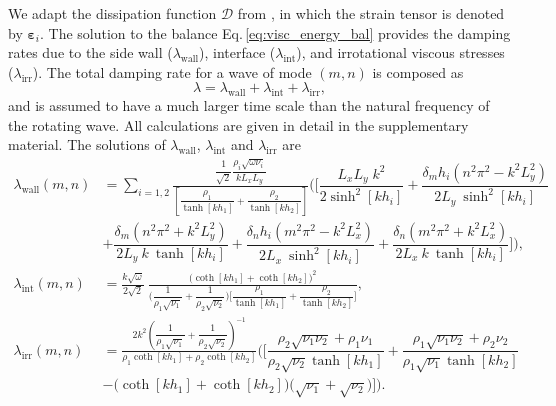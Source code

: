 \documentclass[aps,prfluids,reprint,superscriptaddress]{revtex4-2}
\newcommand{\ii}[1]{\text{#1}}
\newcommand{\nn}{\nonumber}
\begin{document}
We adapt the dissipation function $\mathcal{D}$ from \citet{Lamb1945}, in which the strain tensor is denoted by $\bm{\varepsilon}_i$. The solution to the balance Eq.\,\eqref{eq:visc_energy_bal} provides the damping rates due to the side wall ($\lambda_{\ii{wall}}$), interface ($\lambda_{\ii{int}}$), and irrotational viscous stresses ($\lambda_{\ii{irr}}$). The total damping rate for a wave of mode $(m,n)$ is composed as
\begin{equation}
	\lambda = \lambda_{\ii{wall}}+\lambda_{\ii{int}}+\lambda_{\ii{irr}},
	\label{eq:visc_damp_sum}
\end{equation}
and is assumed to have a much larger time scale than the natural frequency of the rotating wave. All calculations are given in detail in the supplementary material. The solutions of $\lambda_{\ii{wall}}$, $\lambda_{\ii{int}}$ and $\lambda_{\ii{irr}}$ are
\begin{align}
	\nn 
	\lambda_{\ii{wall}} (m,n)  
	&=\sum_{i=1,2}
	\frac{ \dfrac{1}{\sqrt{2}}
		\dfrac{\rho_i \sqrt{\omega\nu_i}}{ kL_xL_y }
	}
	{ 
		\left[
		\dfrac{\rho_1}{\tanh[kh_1]} + \dfrac{\rho_2}{\tanh[kh_2]}
		\right]}
	\Biggl( \biggl[
	\dfrac{L_xL_y \; k^2}{2\sinh^2[kh_i]}
	+
	\dfrac{ \delta_{m} h_i(n^2\pi^2  - k^2L_y^2)}{ 2 L_y\:\sinh^2[kh_i]}
	\\[5pt]
	& + \dfrac{ \delta_m (n^2\pi^2 + k^2L_y^2)}{ 2 L_y \: k\:\tanh[kh_i]}
	+
	\dfrac{\delta_n h_i(m^2\pi^2  - k^2L_x^2)}{ 2 L_x\:\sinh^2[kh_i]}
	+
	\dfrac{ \delta_n (m^2\pi^2 + k^2L_x^2)}{ 2 L_x \: k\:\tanh[kh_i]}
	\biggr] \Biggr) , &&
	\label{eq:visc_damp_wall}
	\\
	\lambda_{\ii{int}} (m,n)
	&=\frac{k\sqrt{\omega}}{2\sqrt{2}}
	\:\frac{\bigl( \coth[kh_1] + \coth[kh_2] \bigr)^2}
	{ \biggl( \dfrac{1}{\rho_1\sqrt{\nu_1}} + \dfrac{1}{\rho_2\sqrt{\nu_2}} \biggr)
		\biggl[ \dfrac{\rho_1}{\tanh[kh_1]} + \dfrac{\rho_2}{\tanh[kh_2]} \biggr]
	} , &&
	\label{eq:visc_damp_interface}
	\\
	\nn \lambda_{\ii{irr}} (m,n) &= \frac{2k^2 \left( \dfrac{1}{\rho_1\sqrt{\nu_1}} + \dfrac{1}{\rho_2\sqrt{\nu_2}} \right)^{-1}}{\rho_1\coth{[kh_1]} +
		\rho_2\coth{[kh_2]}} \Biggl(\biggl[ 
	\dfrac{\rho_2\sqrt{\nu_1\nu_2} + \rho_1\nu_1}{\rho_2\sqrt{\nu_2} \tanh{[kh_1]}} +
	\dfrac{\rho_1\sqrt{\nu_1\nu_2} + \rho_2\nu_2}{\rho_1\sqrt{\nu_1} \tanh{[kh_2]}} &&
	\\[2.5pt]
	&  -\bigl(\coth{[kh_1]}+\coth{[kh_2]}\bigr)\bigl(\sqrt{\nu_1} + \sqrt{\nu_2}\bigr) 
	\biggr]\Biggr) . &&
	\label{eq:visc_damp_extra}
\end{align}
\end{document}
